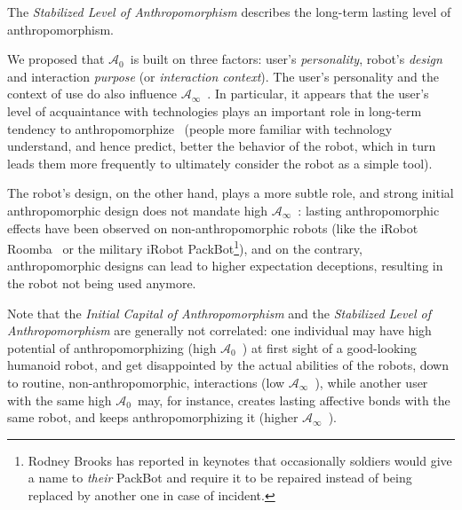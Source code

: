 \documentclass{frontiersSCNS} %
\newcommand{\ICA}{{$\mathcal{A}_0$~}}
\newcommand{\SLA}{{$\mathcal{A}_\infty$~}}
\begin{document}
The \emph{Stabilized Level of Anthropomorphism} describes the long-term lasting level of
anthropomorphism.

We proposed that \ICA is built on three factors: user's \emph{personality},
robot's \emph{design} and interaction \emph{purpose} (or \emph{interaction
context}). The user's personality and the context of use do also influence \SLA.
In particular, it appears that the user's level of acquaintance with
technologies plays an important role in long-term tendency to
anthropomorphize~\citep{fink_living_2013} (people more familiar with technology
understand, and hence predict, better the behavior of the robot, which in turn
leads them more frequently to ultimately consider the robot as a simple tool).

The robot's design, on the other hand, plays a more subtle role, and strong
initial anthropomorphic design does not mandate high \SLA: lasting
anthropomorphic effects have been observed on non-anthropomorphic robots (like
the iRobot Roomba~\citep{fink_living_2013} or the military iRobot
PackBot\footnote{Rodney Brooks has reported in keynotes that occasionally
soldiers would give a name to \emph{their} PackBot and require it to be repaired
instead of being replaced by another one in case of incident.}), and on the
contrary, anthropomorphic designs can lead to higher expectation deceptions,
resulting in the robot not being used anymore.

Note that the \emph{Initial Capital of Anthropomorphism} and the
\emph{Stabilized Level of Anthropomorphism} are generally not correlated: one
individual may have high potential of anthropomorphizing (high \ICA) at first
sight of a good-looking humanoid robot, and get disappointed by the actual
abilities of the robots, down to routine, non-anthropomorphic, interactions (low
\SLA), while another user with the same high \ICA may, for instance, creates
lasting affective bonds with the same robot, and keeps anthropomorphizing it
(higher \SLA).



%
%
%
%
%
%
\end{document}
